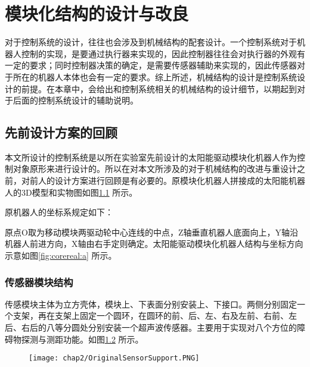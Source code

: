 
\chapter{模块化结构的设计与改良}
\label{chap:mechanicalSystem}
对于控制系统的设计，往往也会涉及到机械结构的配套设计。一个控制系统对于机器人控制的实现，是要通过执行器来实现的，因此控制器往往会对执行器的外观有一定的要求；同时控制器决策的确定，是需要传感器辅助来实现的，因此传感器对于所在的机器人本体也会有一定的要求。综上所述，机械结构的设计是控制系统设计的前提。在本章中，会给出和控制系统相关的机械结构的设计细节，以期起到对于后面的控制系统设计的辅助说明。

\section{先前设计方案的回顾}
本文所设计的控制系统是以所在实验室先前设计的太阳能驱动模块化机器人作为控制对象原形来进行设计的。所以在对本文所涉及的对于机械结构的改进与重设计之前，对前人的设计方案进行回顾是有必要的。原模块化机器人拼接成的太阳能机器人的3D模型和实物图如图\ref{fig.OriginalModel} 所示。 \\
\begin{figure}\label{fig.OriginalModel}
  \centering
  \hspace{1in}
\end{figure}
原机器人的坐标系规定如下：

原点O取为移动模块两驱动轮中心连线的中点，Z轴垂直机器人底面向上，Y轴沿机器人前进方向，X轴由右手定则确定。太阳能驱动模块化机器人结构与坐标方向示意如图\ref{fig:corereal:a} 所示。
\subsection{传感器模块结构}
传感模块主体为立方壳体，模块上、下表面分别安装上、下接口。两侧分别固定一个支架，再在支架上固定一个圆环，在圆环的前、后、左、右及左前、右前、左后、右后的八等分圆处分别安装一个超声波传感器。主要用于实现对八个方位的障碍物探测与测距功能。如图\ref{fig.SensorSupport} 所示。
\begin{figure}[!htp]\label{fig.SensorSupport}
  \centering
  \texttt{[image: chap2/OriginalSensorSupport.PNG]}
\end{figure}
